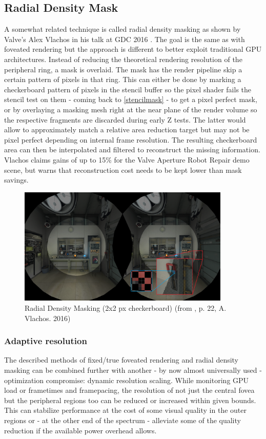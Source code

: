 \subsection{Radial Density Mask}
A somewhat related technique is called radial density masking as shown by Valve's Alex Vlachos in his talk at GDC 2016 \cite{Vlachos.2016c}. The goal is the same as with foveated rendering but the approach is different to better exploit traditional GPU architectures. Instead of reducing the theoretical rendering resolution of the peripheral ring, a mask is overlaid. The mask has the render pipeline skip a certain pattern of pixels in that ring. This can either be done by marking a checkerboard pattern of pixels in the stencil buffer so the pixel shader fails the stencil test on them - coming back to \autoref{stencilmask} - to get a pixel perfect mask, or by overlaying a masking mesh right at the near plane of the render volume so the respective fragments are discarded during early Z tests. The latter would allow to approximately match a relative area reduction target but may not be pixel perfect depending on internal frame resolution. The resulting checkerboard area can then be interpolated and filtered to reconstruct the missing information. Vlachos claims gains of up to 15\% for the Valve Aperture Robot Repair demo scene, but warns that reconstruction cost needs to be kept lower than mask savings. 

\begin{figure}[!htb]
  \centering
  \includegraphics[width=0.9\textwidth]{pictures/vlachos_RDM}
  \caption{Radial Density Masking (2x2 px checkerboard) (from \cite{Vlachos.2016c}, p. 22, A. Vlachos. 2016)} \label{fig:vlachos_RDM}
\end{figure} 

\subsubsection{Adaptive resolution}
The described methods of fixed/true foveated rendering and radial density masking can be combined further with another - by now almost universally used - optimization compromise: dynamic resolution scaling. While monitoring GPU load or frametimes and framepacing, the resolution of not just the central fovea but the peripheral regions too can be reduced or increased within given bounds. This can stabilize performance at the cost of some visual quality in the outer regions or - at the other end of the spectrum - alleviate some of the quality reduction if the available power overhead allows. 

